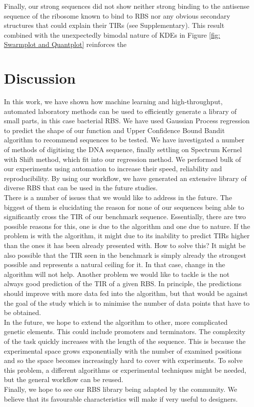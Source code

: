 \documentclass{article}
\begin{document}
Finally, our strong sequences did not show neither strong binding to the antisense sequence of the ribosome known to bind to RBS nor any obvious secondary structures that could explain their TIRs (see Supplementary).
This result combined with the unexpectedly bimodal nature of KDEs in Figure \ref{fig: Swarmplot and Quantplot} reinforces the 

\section{Discussion}

In this work, we have shown how machine learning and high-throughput, automated laboratory methods can be used to efficiently generate a library of small parts, in this case bacterial RBS. 
We have used Gaussian Process regression to predict the shape of our function and Upper Confidence Bound Bandit algorithm to recommend sequences to be tested.
We have investigated a number of methods of digitising the DNA sequence, finally settling on Spectrum Kernel with Shift method, which fit into our regression method.
We performed bulk of our experiments using automation to increase their speed, reliability and reproducibility.
By using our workflow, we have generated an extensive library of diverse RBS that can be used in the future studies.\\
There is a number of issues that we would like to address in the future.
The biggest of them is elucidating the reason for none of our sequences being able to significantly cross the TIR of our benchmark sequence.
Essentially, there are two possible reasons for this, one is due to the algorithm and one due to nature.
If the problem is with the algorithm, it might due to its inability to predict TIRs higher than the ones it has been already presented with.
How to solve this?
It might be also possible that the TIR seen in the benchmark is simply already the strongest possible and represents a natural ceiling for it. 
In that case, change in the algorithm will not help.
Another problem we would like to tackle is the not always good prediction of the TIR of a given RBS.
In principle, the predictions should improve with more data fed into the algorithm, but that would be against the goal of the study which is to minimise the number of data points that have to be obtained.\\
In the future, we hope to extend the algorithm to other, more complicated genetic elements.
This could include promoters and terminators.
The complexity of the task quickly increases with the length of the sequence.
This is because the experimental space grows exponentially with the number of examined positions and so the space becomes increasingly hard to cover with experiments.
To solve this problem, a different algorithms or experimental techniques might be needed, but the general workflow can be reused.\\
Finally, we hope to see our RBS library being adapted by the community.
We believe that its favourable characteristics will make if very useful to designers.
\end{document}
